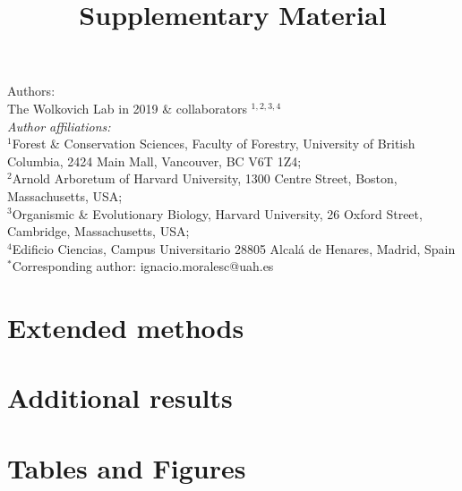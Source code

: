 \documentclass{article}\usepackage[]{graphicx}\usepackage[]{color}
\title{Supplementary Material}
\begin{document}
\maketitle

\noindent Authors:\\
The Wolkovich Lab in 2019 \& collaborators $^{1,2,3,4}$ %
\vspace{2ex}\\
\emph{Author affiliations:}\\
$^{1}$Forest \& Conservation Sciences, Faculty of Forestry, University of British Columbia, 2424 Main Mall, Vancouver, BC V6T 1Z4;\\
$^{2}$Arnold Arboretum of Harvard University, 1300 Centre Street, Boston, Massachusetts, USA;\\
$^{3}$Organismic \& Evolutionary Biology, Harvard University, 26 Oxford Street, Cambridge, Massachusetts, USA;\\
$^{4}$Edificio Ciencias, Campus Universitario 28805 Alcalá de Henares, Madrid, Spain\\
 

\vspace{2ex}
$^*$Corresponding author: ignacio.moralesc@uah.es\\
\renewcommand{\thetable}{\arabic{table}}
\renewcommand{\thefigure}{\arabic{figure}}
\renewcommand{\labelitemi}{$-$}

\clearpage

\section*{Extended methods}


\section*{Additional results}




%
%

\section*{Tables and Figures} 
\end{document}
